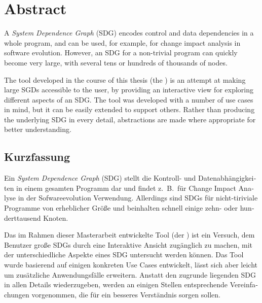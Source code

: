 \chapter*{Abstract} \vspace{-0.5cm}

A \emph{System Dependence Graph} (SDG) encodes control and data dependencies in a whole program, and can be used, for 
example, for change impact analysis in software evolution. However, an SDG for a non-trivial program can quickly become 
very large, with several tens or hundreds of thousands of nodes.

The tool developed in the course of this thesis (the \emph{\SB}) is an attempt at making large SGDs accessible to the 
user, by providing an interactive view for exploring different aspects of an SDG. The tool was developed with a number 
of use cases in mind, but it can be easily extended to support others. Rather than producing the underlying SDG in 
every detail, abstractions are made where appropriate for better understanding.


\begin{otherlanguage}{ngerman}
\begingroup
\let\clearpage\relax
\chapter*{Kurzfassung} \vspace{-0.5cm}
\endgroup

Ein \emph{System Dependence Graph} (SDG) stellt die Kontroll- und Datenabhängigkeiten in einem gesamten Programm dar 
und findet z.\ B.\ für Change Impact Analyse in der Sofwareevolution Verwendung. Allerdings sind SDGs für 
nicht-tiriviale Programme von erheblicher Größe und beinhalten schnell einige zehn- oder hunderttausend Knoten.

Das im Rahmen dieser Masterarbeit entwickelte Tool (der \emph{\SB}) ist ein Versuch, dem Benutzer große SDGs durch eine 
Interaktive Ansicht zugänglich zu machen, mit der unterschiedliche Aspekte eines SDG untersucht werden können. Das Tool 
wurde basierend auf einigen konkreten Use Cases entwickelt, lässt sich aber leicht um zusätzliche Anwendungsfälle 
erweitern. Anstatt den zugrunde liegenden SDG in allen Details wiederzugeben, werden an einigen Stellen entsprechende 
Vereinfachungen vorgenommen, die für ein besseres Verständnis sorgen sollen.

\end{otherlanguage}
